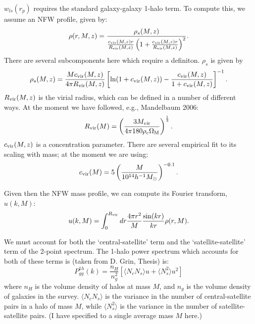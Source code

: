 \documentclass[onecolumn,amsmath,aps,fleqn, superscriptaddress]{revtex4}
\begin{document}
$w_{ls}(r_p)$ requires the standard galaxy-galaxy 1-halo term. To compute this, we assume an NFW profile, given by:
\begin{equation}
\rho(r, M, z) = \frac{\rho_s(M,z)}{\frac{c_{\rm vir}(M,z)r}{R_{\rm vir}(M,z)}\left(1+\frac{c_{\rm vir}(M,z)r}{R_{\rm vir}(M,z)}\right)^2}.
\label{nfw}
\end{equation}
There are several subcomponents here which require a definiton. $\rho_s$ is given by
\begin{equation}
\rho_s(M,z) = \frac{Mc_{\rm vir}(M,z)}{4 \pi R_{\rm vir}(M,z)}\left[{\rm ln} (1+ c_{\rm vir}(M,z)) - \frac{c_{\rm vir}(M,z)}{1+c_{\rm vir}(M,z)}\right]^{-1}.
\label{rhos}
\end{equation}
$R_{\rm vir}(M,z)$ is the virial radius, which can be defined in a number of different ways. At the moment we have followed, e.g., Mandelbaum 2006:
\begin{equation}
R_{\rm vir}(M) = \left(\frac{3 M_{\rm vir}}{4 \pi 180 \rho_c \Omega_{\rm M}} \right)^{\frac{1}{3}}.
\label{Rvir}
\end{equation}
$c_{\rm vir}(M,z)$ is a concentration parameter. There are several empirical fit to its scaling with mass; at the moment we are using:
\begin{equation}
c_{\rm vir}(M) = 5\left(\frac{M}{10^{14}h^{-1}M_{\odot}}\right)^{-0.1}.
\label{cvir}
\end{equation}

Given then the NFW mass profile, we can compute its Fourier transform, $u(k, M)$:
\begin{equation}
u(k, M) = \int_0^{R_{\rm vir}} dr \frac{4 \pi r^2}{M}\frac{\sin(kr)}{kr}\rho(r, M).
\label{u}
\end{equation}

We must account for both the `central-satellite' term and the `satellite-satellite' term of the 2-point spectrum. The 1-halo power spectrum which accounts for both of these terms is (taken from D. Grin, Thesis) is:
\begin{equation}
P_{gg}^{1h}(k) = \frac{n_H}{n_g^2}\left[\langle N_c N_s \rangle u + \langle N_s^2 \rangle u^2\right]
\label{1hpgg}
\end{equation}
where $n_H$ is the volume density of halos at mass $M$, and $n_g$ is the volume density of galaxies in the survey. $\langle N_c N_s \rangle$ is the variance in the number of central-satellite pairs in a halo of mass $M$, while $\langle N_s^2 \rangle$ is the variance in the number of satellite-satellite pairs. (I have specified to a single average mass $M$ here.) 
\end{document}

